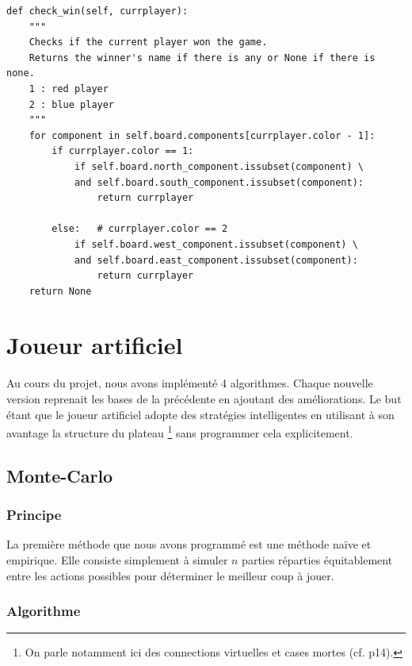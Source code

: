 \documentclass[a4paper]{article}
\theoremstyle{definition}
\begin{document}
\newpage

\begin{lstlisting}
def check_win(self, currplayer):
	"""
	Checks if the current player won the game. 
	Returns the winner's name if there is any or None if there is none.
	1 : red player
	2 : blue player
	"""
	for component in self.board.components[currplayer.color - 1]:
		if currplayer.color == 1:
			if self.board.north_component.issubset(component) \
			and self.board.south_component.issubset(component):
				return currplayer
			
		else: 	# currplayer.color == 2
			if self.board.west_component.issubset(component) \
			and self.board.east_component.issubset(component):
				return currplayer
	return None
\end{lstlisting}

\newpage

\section{Joueur artificiel}

Au cours du projet, nous avons implémenté 4 algorithmes. Chaque nouvelle version reprenait les bases de la précédente en ajoutant des améliorations. Le but étant que le joueur artificiel adopte des stratégies intelligentes en utilisant à son avantage la structure du plateau \footnote{On parle notamment ici des connections virtuelles et cases mortes (cf. p14).} sans programmer cela explicitement.

\subsection{Monte-Carlo}

\subsubsection{Principe}

La première méthode que nous avons programmé est une méthode naïve et empirique. Elle consiste simplement à simuler $n$ parties réparties équitablement entre les actions possibles pour déterminer le meilleur coup à jouer.

\subsubsection{Algorithme}
\end{document}
